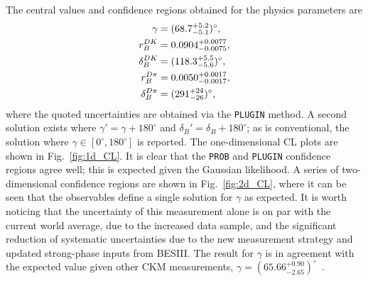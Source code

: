 The central values and confidence regions obtained for the physics parameters are
\begin{align}
\begin{split}\label{eq:phys_results}
    \gamma          &= (68.7^{+5.2}_{-5.1})^\circ, \\
    r_B^{DK}       &= 0.0904^{+0.0077}_{-0.0075}, \\
    \delta_B^{DK}  &= (118.3^{+5.5}_{-5.6})^\circ, \\
    r_B^{{D}\pi}      &= 0.0050^{+0.0017}_{-0.0017}, \\
    \delta_B^{{D}\pi} &= (291^{+24}_{-26})^\circ,
\end{split}
\end{align}
where the quoted uncertainties are obtained via the \texttt{PLUGIN} method. A second solution exists where $\gamma'=\gamma+180^\circ$ and $\delta_B'=\delta_B+180^\circ$; as is conventional, the solution where $\gamma\in[0^\circ,180^\circ]$ is reported. The one-dimensional CL plots are shown in Fig.~\ref{fig:1d_CL}. It is clear that the \texttt{PROB} and \texttt{PLUGIN} confidence regions agree well; this is expected given the Gaussian likelihood. A series of two-dimensional confidence regions are shown in Fig.~\ref{fig:2d_CL}, where it can be seen that the observables define a single solution for $\gamma$ as expected. It is worth noticing that the uncertainty of this measurement alone is on par with the current world average, due to the increased data sample, and the significant reduction of systematic uncertainties due to the new measurement strategy and updated strong-phase inputs from BESIII. The result for $\gamma$ is in agreement with the expected value given other CKM measurements, $\gamma=(65.66^{+0.90}_{-2.65})^\circ$~\cite{CKMfitter2015}.

